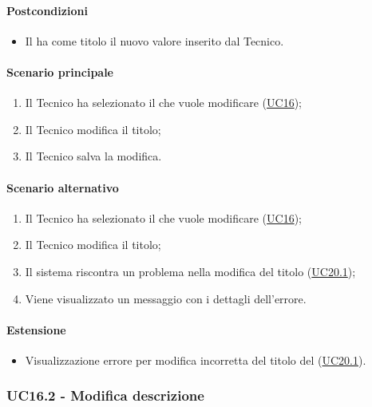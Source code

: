 \paragraph*{Postcondizioni}
\begin{itemize}
  \item Il  ha come titolo il nuovo valore inserito dal Tecnico.
\end{itemize}

\paragraph*{Scenario principale}
\begin{enumerate}
  \item Il Tecnico ha selezionato il  che vuole modificare (\hyperref[UC16]{UC16});
  \item Il Tecnico modifica il titolo;
  \item Il Tecnico salva la modifica.
\end{enumerate}

\paragraph*{Scenario alternativo}
\begin{enumerate}
  \item Il Tecnico ha selezionato il  che vuole modificare (\hyperref[UC16]{UC16});
  \item Il Tecnico modifica il titolo;
  \item Il sistema riscontra un problema nella modifica del titolo (\hyperref[UC20point1]{UC20.1});
  \item Viene visualizzato un messaggio con i dettagli dell'errore.
\end{enumerate}

\paragraph{Estensione}
\begin{itemize}
  \item Visualizzazione errore per modifica incorretta del titolo del  (\hyperref[UC20point1]{UC20.1}).
\end{itemize}


\subsubsection{UC16.2 - Modifica descrizione }\label{UC16point2}
